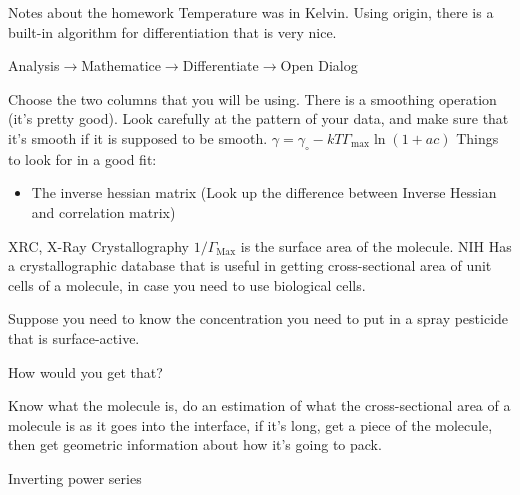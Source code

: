 \documentclass{article}
\begin{document}
\begin{section}{Notes about the homework}
	Temperature was in Kelvin. Using origin, there is a built-in algorithm for differentiation that is very nice.

	Analysis$\rightarrow$Mathematice$\rightarrow$Differentiate$\rightarrow$Open Dialog

	Choose the two columns that you will be using. There is a smoothing operation (it's pretty good). Look carefully at the pattern of your data, and make sure that it's smooth if it is supposed to be smooth.
	$\gamma = \gamma_{\circ} - kT\Gamma_\text{max}\ln{(1+ac)}$
Things to look for in a good fit:
\begin{itemize}
	\item The inverse hessian matrix (Look up the difference between Inverse Hessian and correlation matrix)
\end{itemize}
\end{section}
\begin{section}{XRC, X-Ray Crystallography}
	$1/\Gamma_\text{Max}$ is the surface area of the molecule.
NIH Has a crystallographic database that is useful in getting cross-sectional area of unit cells of a molecule, in case you need to use biological cells.

Suppose you need to know the concentration you need to put in a spray pesticide that is surface-active.

How would you get that?

Know what the molecule is, do an estimation of what the cross-sectional area of a molecule is as it goes into the interface, if it's long, get a piece of the molecule, then get geometric information about how it's going to pack.


\end{section}






\begin{section}{Inverting power series}

\end{section}
\end{document}
